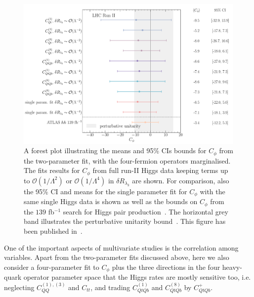 \begin{figure}[htpb!]
	\begin{center}
		\includegraphics[width=\linewidth]{fig/uebeblick_forest_cphi_LHC_RunII}
	\end{center}
	\caption{A forest plot illustrating the means and 95\% CIs bounds for $C_\phi$ from the two-parameter fit, with the four-fermion operators marginalised. The fits results for $C_\phi$ from full run-II Higgs data keeping terms up to $\mathcal{O}(1/\Lambda^2)$ or $\mathcal{O}(1/\Lambda^4)$ in $\delta R_{\lambda_3}$ are shown.  For comparison, also the 95\% CI and means for the single parameter fit for $C_\phi$ with the same single Higgs data is shown as well as the bounds on $C_{\phi}$ from the $139$ fb$^{-1}$ search for Higgs pair production~\cite{ATLAS:2021jki}. The horizontal grey band illustrates the perturbative unitarity bound~\cite{DiLuzio:2017tfn}. This figure has been published in~\cite{Alasfar:2022zyr}.\label{fig:summcphi}  }
\end{figure}
\par 
One of the important aspects of multivariate studies is the correlation among variables. Apart from the two-parameter fits discussed above, here we also consider a four-parameter fit to $C_\phi$ plus the three directions in the four heavy-quark operator parameter space that the Higgs rates are
mostly sensitive too, i.e. neglecting $C_{QQ}^{(1),(3) }$ and $C_{tt}$, and trading $C_{QtQb}^{(1)}$ and $C_{QtQb}^{(8)}$ by $C_{QtQb}^{+}$.
